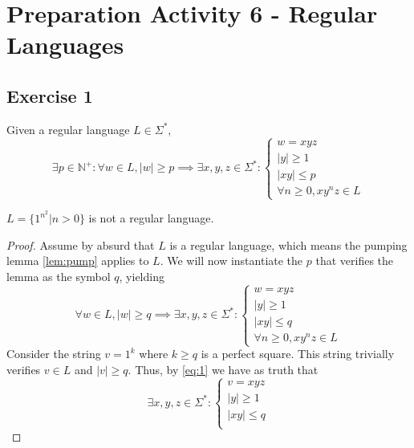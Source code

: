 \setcounter{section}{5}
\section{Preparation Activity 6 - Regular Languages}
{
\renewcommand{\thesubsubsection}{\thesubsection\alph{subsubsection}}
\subsection{Exercise 1}
\begin{lemma} \label{lem:pump}
Given a regular language $L \in \Sigma^\ast$,
\begin{equation*}
	\exists p \in \mathbb{N}^+ \colon \forall w \in L, |w|\geq p \implies
	\exists x,y,z \in \Sigma^\ast \colon
	\begin{cases}
		w=xyz\\
		|y|\geq 1\\
		|xy|\leq p\\
		\forall n \geq 0, x y^n z \in L
	\end{cases}
\end{equation*}
\end{lemma}
\begin{theorem}
	$L=\{1^{n^2} | n>0\}$ is not a regular language.
\end{theorem}
\begin{proof}
Assume by absurd that $L$ is a regular language, which means the pumping lemma \eqref{lem:pump} applies to $L$. We will now instantiate the $p$ that verifies the lemma as the symbol $q$, yielding
	\begin{equation} \label{eq:1}
	\forall w \in L, |w|\geq q \implies
	\exists x,y,z \in \Sigma^\ast \colon
	\begin{cases}
		w=xyz\\
		|y|\geq 1\\
		|xy|\leq q\\
		\forall n \geq 0, x y^n z \in L
	\end{cases}
\end{equation}
Consider the string $v=1^k$ where $k\geq q$ is a perfect square. This string trivially verifies $v \in L$ and $|v|\geq q$. Thus, by \eqref{eq:1} we have as truth that
\begin{equation}\label{eq:3}
	\exists x,y,z \in \Sigma^\ast \colon
	\begin{cases}
		v=xyz\\
		|y|\geq 1\\
		|xy|\leq q\\

\end{cases}
\end{equation}
\end{proof}}
